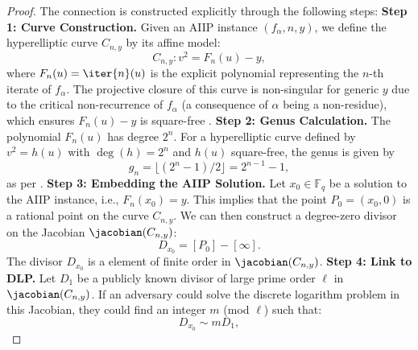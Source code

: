             \begin{proof}
                The connection is constructed explicitly through the following steps:
                \textbf{Step 1: Curve Construction.}
                    Given an AIIP instance \( (f_\alpha, n, y) \), we define the hyperelliptic curve \( C_{n,y} \) by its affine model:
                    \begin{equation}\label{eq:curve-connection}
                        C_{n,y}: v^2 = F_n(u) - y,
                    \end{equation}
                    where \( F_n(u) = \iter{n}(u) \) is the explicit polynomial representing the \( n \)-th iterate of \( f_\alpha \). The projective closure of this curve is non-singular for generic \( y \) due to the critical non-recurrence of \( f_\alpha \) (a consequence of \( \alpha \) being a non-residue), which ensures \( F_n(u) - y \) is square-free \cite[Chapter 4]{Silverman2007}.
                \textbf{Step 2: Genus Calculation.}
                    The polynomial \( F_n(u) \) has degree \( 2^n \). For a hyperelliptic curve defined by \( v^2 = h(u) \) with \( \deg(h) = 2^n \) and \( h(u) \) square-free, the genus is given by
                    \begin{equation}
                        g_n = \lfloor (2^n - 1)/2 \rfloor = 2^{n-1} - 1,
                    \end{equation}
                    as per \cite[Proposition 7.4.24]{Cohen2010}.
                \textbf{Step 3: Embedding the AIIP Solution.}
                    Let \( x_0 \in \mathbb{F}_q \) be a solution to the AIIP instance, i.e., \( F_n(x_0) = y \). This implies that the point \( P_0 = (x_0, 0) \) is a rational point on the curve \( C_{n,y} \). We can then construct a degree-zero divisor on the Jacobian \( \jacobian(C_{n,y}) \):
                    \begin{equation}
                        D_{x_0} = [P_0] - [\infty].
                    \end{equation}
                    The divisor \( D_{x_0} \) is a element of finite order in \( \jacobian(C_{n,y}) \).
                \textbf{Step 4: Link to DLP.}
                    Let \( D_1 \) be a publicly known divisor of large prime order \( \ell \) in \( \jacobian(C_{n,y}) \). If an adversary could solve the discrete logarithm problem in this Jacobian, they could find an integer \( m \) (mod \( \ell \)) such that:
                    \begin{equation}
                        D_{x_0} \sim m D_1,

\end{equation}
\end{proof}
